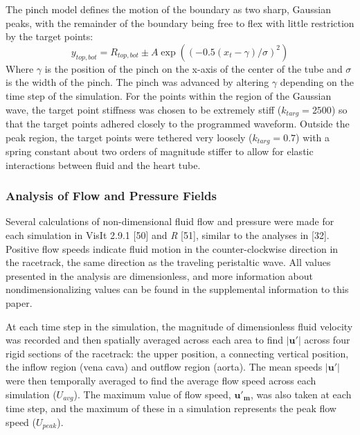 \documentclass[
]{article}
\begin{document}
The pinch model defines the motion of the boundary as two sharp,
Gaussian peaks, with the remainder of the boundary being free to flex
with little restriction by the target points: \begin{equation}
y_{top,bot} = R_{top,bot} \pm A\exp((-0.5(x_t-\gamma)/\sigma)^2)
\label{eq:gaussianwaves}
\end{equation} Where \(\gamma\) is the position of the pinch on the
x-axis of the center of the tube and \(\sigma\) is the width of the
pinch. The pinch was advanced by altering \(\gamma\) depending on the
time step of the simulation. For the points within the region of the
Gaussian wave, the target point stiffness was chosen to be extremely
stiff (\(k_{targ}=2500\)) so that the target points adhered closely to
the programmed waveform. Outside the peak region, the target points were
tethered very loosely (\(k_{targ}=0.7\)) with a spring constant about
two orders of magnitude stiffer to allow for elastic interactions
between fluid and the heart tube.

\hypertarget{analysis-of-flow-and-pressure-fields}{%
\subsubsection{Analysis of Flow and Pressure
Fields}\label{analysis-of-flow-and-pressure-fields}}

Several calculations of non-dimensional fluid flow and pressure were
made for each simulation in VisIt 2.9.1 {[}50{]} and \emph{R} {[}51{]},
similar to the analyses in {[}32{]}. Positive flow speeds indicate fluid
motion in the counter-clockwise direction in the racetrack, the same
direction as the traveling peristaltic wave. All values presented in the
analysis are dimensionless, and more information about
nondimensionalizing values can be found in the supplemental information
to this paper.

At each time step in the simulation, the magnitude of dimensionless
fluid velocity was recorded and then spatially averaged across each area
to find \(|\mathbf{u'}|\) across four rigid sections of the racetrack:
the upper position, a connecting vertical position, the inflow region
(vena cava) and outflow region (aorta). The mean speeds
\(|\mathbf{u'}|\) were then temporally averaged to find the average flow
speed across each simulation (\(U_{avg}\)). The maximum value of flow
speed, \(\mathbf{u'_{m}}\), was also taken at each time step, and the
maximum of these in a simulation represents the peak flow speed
(\(U_{peak}\)).
\end{document}
